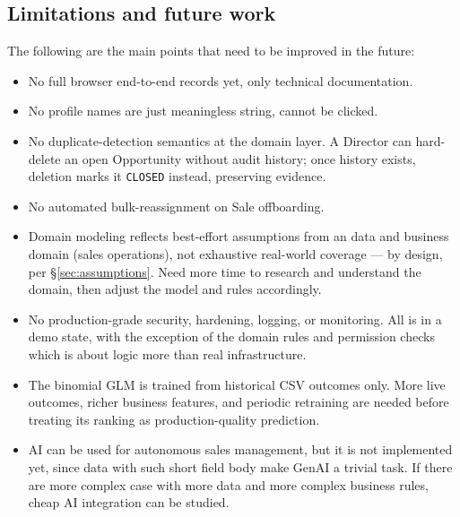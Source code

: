 \documentclass[13pt, a4paper]{article}
\begin{document}
\subsection{Limitations and future work}
The following are the main points that need to be improved in the future:
\begin{itemize}
    \item No full browser end-to-end records yet, only technical documentation.
    \item No profile names are just meaningless string, cannot be clicked.
    \item No duplicate-detection semantics at the domain layer. A Director can hard-delete an
        open Opportunity without audit history; once history exists, deletion marks it
        \texttt{CLOSED} instead, preserving evidence.
    \item No automated bulk-reassignment on Sale offboarding.
    \item Domain modeling reflects best-effort assumptions from an data and business
        domain (sales operations), not exhaustive real-world coverage — by design, per
        \S\ref{sec:assumptions}. Need more time to research and understand the domain, 
        then adjust the model and rules accordingly.
    \item No production-grade security, hardening, logging, or monitoring. All is in a demo state, 
    with the exception of the domain rules and permission checks which is about logic more than real infrastructure.
    \item The binomial GLM is trained from historical CSV outcomes only. More live outcomes,
        richer business features, and periodic retraining are needed before treating its ranking
        as production-quality prediction.
    \item AI can be used for autonomous sales management, but it is not implemented yet, since data with such short field body 
    make GenAI a trivial task. If there are more complex case with more data and more complex business rules, cheap AI integration can be 
    studied.
\end{itemize}
\end{document}

